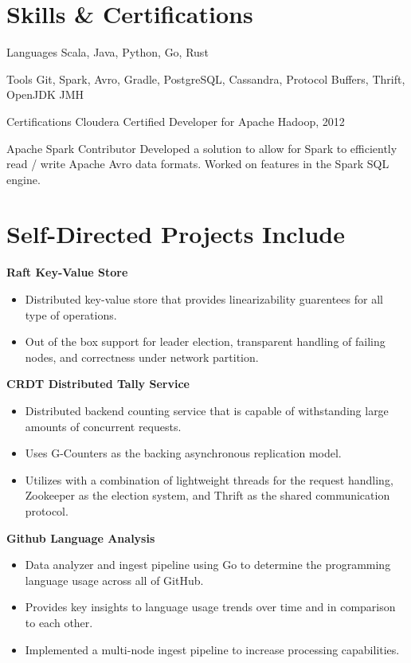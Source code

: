 \documentclass[a4paper,margin,line]{resume}
\begin{document}
\begin{resume}
\section{\mysidestyle Skills \& Certifications}
  \begin{compactdesc}
  \item[Languages] \small Scala, Java, Python, Go, Rust
  \item[Tools] \small Git, Spark, Avro, Gradle, PostgreSQL, Cassandra, Protocol Buffers, Thrift,
    OpenJDK JMH
  \item[Certifications] \small Cloudera Certified Developer for Apache Hadoop, 2012    
  \item[Apache Spark Contributor] Developed a solution to allow for Spark to efficiently read /
    write Apache Avro data formats. Worked on features in the Spark SQL engine.
  \end{compactdesc}
  \vspace{-2mm}
\section{\mysidestyle Self-Directed Projects Include}
  \textbf{Raft Key-Value Store}
  \begin{itemize}[noitemsep,nolistsep]
    \item Distributed key-value store that provides linearizability guarentees for all type of
      operations.
    \item Out of the box support for leader election, transparent handling of failing nodes, and
      correctness under network partition.
  \end{itemize}
  \vspace{-2mm}
  \textbf{CRDT Distributed Tally Service}
  \begin{itemize}[noitemsep,nolistsep]
    \item Distributed backend counting service that is capable of withstanding large amounts of
      concurrent requests.
    \item Uses G-Counters as the backing asynchronous replication model.
    \item Utilizes with a combination of lightweight threads for the request handling, Zookeeper
      as the election system, and Thrift as the shared communication protocol.
  \end{itemize}
  \vspace{-2mm}
  \textbf{Github Language Analysis}
  \begin{itemize}[noitemsep,nolistsep]
    \item Data analyzer and ingest pipeline using Go to determine the programming language usage
      across all of GitHub.
    \item Provides key insights to language usage trends over time and in comparison to each other.
    \item Implemented a multi-node ingest pipeline to increase processing capabilities.
  \end{itemize}
\end{resume}
\end{document}
